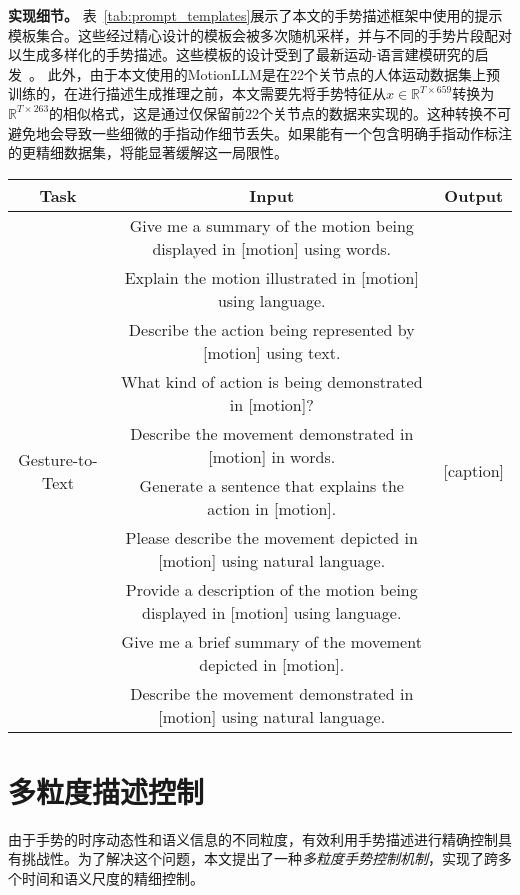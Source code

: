 \textbf{实现细节。}
表~\ref{tab:prompt_templates}展示了本文的手势描述框架中使用的提示模板集合。这些经过精心设计的模板会被多次随机采样，并与不同的手势片段配对以生成多样化的手势描述。这些模板的设计受到了最新运动-语言建模研究的启发~\cite{jiang2024motiongpt}。
此外，由于本文使用的MotionLLM是在22个关节点的人体运动数据集上预训练的，在进行描述生成推理之前，本文需要先将手势特征从$x\in \mathbb{R}^{T\times 659}$转换为$\mathbb{R}^{T\times 263}$的相似格式，这是通过仅保留前22个关节点的数据来实现的。这种转换不可避免地会导致一些细微的手指动作细节丢失。如果能有一个包含明确手指动作标注的更精细数据集，将能显著缓解这一局限性。

\begin{table*}[t]
\centering
\caption{手势描述框架中使用的提示模板示例。}
\footnotesize
\label{tab:prompt_templates}
\begin{tabular}{ccc}
\toprule
Task & Input & Output \\
\midrule
\multirow{10}{*}{Gesture-to-Text} & Give me a summary of the motion being displayed in [motion] using words. & \multirow{10}{*}{[caption]} \\
& Explain the motion illustrated in [motion] using language. & \\
& Describe the action being represented by [motion] using text. & \\
& What kind of action is being demonstrated in [motion]? & \\
& Describe the movement demonstrated in [motion] in words. & \\
& Generate a sentence that explains the action in [motion]. & \\
& Please describe the movement depicted in [motion] using natural language. & \\
& Provide a description of the motion being displayed in [motion] using language. & \\
& Give me a brief summary of the movement depicted in [motion]. & \\
& Describe the movement demonstrated in [motion] using natural language. & \\
\bottomrule
\end{tabular}
\end{table*}

\section{多粒度描述控制}
\label{sec:method:control}
由于手势的时序动态性和语义信息的不同粒度，有效利用手势描述进行精确控制具有挑战性。为了解决这个问题，本文提出了一种\textit{多粒度手势控制机制}，实现了跨多个时间和语义尺度的精细控制。

